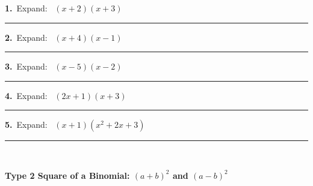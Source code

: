\documentclass[11pt,letterpaper]{article}
\newcommand{\topicbar}[1]{\needspace{4.5cm}\par\vspace{5mm}
  \begin{tcolorbox}[enhanced,colback=fmtitle,colframe=fmtitle,arc=2mm,left=4mm,top=1.5mm,bottom=1.5mm]
  \color{white}\bfseries\large #1
  \end{tcolorbox}}
\begin{document}
\needspace{2.6cm}\par\vspace{3mm}\noindent\begin{minipage}[t]{0.48\linewidth}{\color{fmturn}\bfseries 1.}\ Expand: \ $(x + 2)(x + 3)$\par\vspace{1.6cm}\hfill\rule{4.2cm}{0.4pt}\end{minipage}\hfill\begin{minipage}[t]{0.48\linewidth}{\color{fmturn}\bfseries 2.}\ Expand: \ $(x + 4)(x - 1)$\par\vspace{1.6cm}\hfill\rule{4.2cm}{0.4pt}\end{minipage}\par
\needspace{2.6cm}\par\vspace{3mm}\noindent\begin{minipage}[t]{0.48\linewidth}{\color{fmturn}\bfseries 3.}\ Expand: \ $(x - 5)(x - 2)$\par\vspace{1.6cm}\hfill\rule{4.2cm}{0.4pt}\end{minipage}\hfill\begin{minipage}[t]{0.48\linewidth}{\color{fmturn}\bfseries 4.}\ Expand: \ $(2x + 1)(x + 3)$\par\vspace{1.6cm}\hfill\rule{4.2cm}{0.4pt}\end{minipage}\par
\needspace{2.6cm}\par\vspace{3mm}\noindent\begin{minipage}[t]{0.48\linewidth}{\color{fmturn}\bfseries 5.}\ Expand: \ $(x + 1)(x^2 + 2x + 3)$\par\vspace{1.6cm}\hfill\rule{4.2cm}{0.4pt}\end{minipage}\hfill\begin{minipage}[t]{0.48\linewidth}\ \end{minipage}\par
\needspace{9cm}\topicbar{Type 2 \quad Square of a Binomial: $(a+b)^2$ and $(a-b)^2$}
\end{document}
